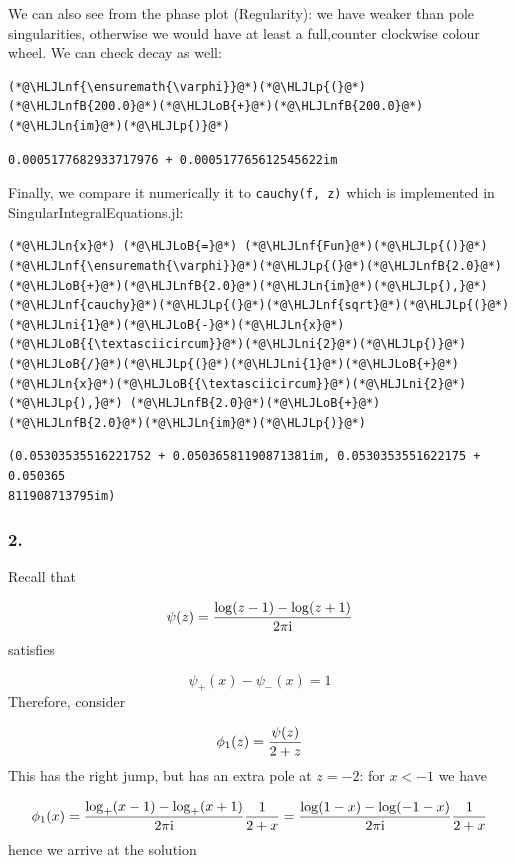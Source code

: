 \documentclass[12pt,a4paper]{article}
\newcommand{\HLJLn}[1]{#1}
\newcommand{\HLJLnf}[1]{\textcolor[RGB]{66,102,213}{#1}}
\newcommand{\HLJLnfB}[1]{\textcolor[RGB]{59,151,46}{#1}}
\newcommand{\HLJLni}[1]{\textcolor[RGB]{59,151,46}{#1}}
\newcommand{\HLJLoB}[1]{\textcolor[RGB]{102,102,102}{\textbf{#1}}}
\newcommand{\HLJLp}[1]{#1}
\def\I{ {\rm i} }
\begin{document}
We can also see from the phase plot (Regularity): we have weaker than pole singularities,  otherwise we would have at least a full,counter clockwise colour wheel. We can check decay as well:


\begin{lstlisting}
(*@\HLJLnf{\ensuremath{\varphi}}@*)(*@\HLJLp{(}@*)(*@\HLJLnfB{200.0}@*)(*@\HLJLoB{+}@*)(*@\HLJLnfB{200.0}@*)(*@\HLJLn{im}@*)(*@\HLJLp{)}@*)
\end{lstlisting}

\begin{lstlisting}
0.0005177682933717976 + 0.000517765612545622im
\end{lstlisting}


Finally, we compare it numerically it to \texttt{cauchy(f, z)} which is implemented in SingularIntegralEquations.jl:


\begin{lstlisting}
(*@\HLJLn{x}@*) (*@\HLJLoB{=}@*) (*@\HLJLnf{Fun}@*)(*@\HLJLp{()}@*)
(*@\HLJLnf{\ensuremath{\varphi}}@*)(*@\HLJLp{(}@*)(*@\HLJLnfB{2.0}@*)(*@\HLJLoB{+}@*)(*@\HLJLnfB{2.0}@*)(*@\HLJLn{im}@*)(*@\HLJLp{),}@*)(*@\HLJLnf{cauchy}@*)(*@\HLJLp{(}@*)(*@\HLJLnf{sqrt}@*)(*@\HLJLp{(}@*)(*@\HLJLni{1}@*)(*@\HLJLoB{-}@*)(*@\HLJLn{x}@*)(*@\HLJLoB{{\textasciicircum}}@*)(*@\HLJLni{2}@*)(*@\HLJLp{)}@*)(*@\HLJLoB{/}@*)(*@\HLJLp{(}@*)(*@\HLJLni{1}@*)(*@\HLJLoB{+}@*)(*@\HLJLn{x}@*)(*@\HLJLoB{{\textasciicircum}}@*)(*@\HLJLni{2}@*)(*@\HLJLp{),}@*) (*@\HLJLnfB{2.0}@*)(*@\HLJLoB{+}@*)(*@\HLJLnfB{2.0}@*)(*@\HLJLn{im}@*)(*@\HLJLp{)}@*)
\end{lstlisting}

\begin{lstlisting}
(0.05303535516221752 + 0.05036581190871381im, 0.0530353551622175 + 0.050365
811908713795im)
\end{lstlisting}


\subsubsection{2.}
Recall that

\[
\psi(z) = {\log(z-1) - \log(z+1)  \over 2 \pi \I}
\]
satisfies

\[
\psi_+(x) - \psi_-(x) = 1
\]
Therefore, consider

\[
\phi_1(z) = {\psi(z) \over 2 + z}
\]
This has the right jump, but has an extra pole at $z = -2$: for $x < -1$ we have

\[
\phi_1(x) = {\log_+(x-1) - \log_+(x+1)  \over 2 \pi \I} {1 \over 2 + x} = 
   {\log(1-x) - \log(-1-x)  \over 2 \pi \I} {1 \over 2 + x}
\]
hence we arrive at the solution
\end{document}

